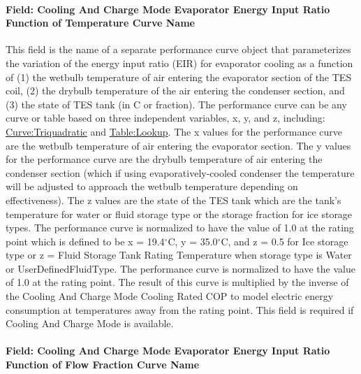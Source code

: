 \paragraph{Field: Cooling And Charge Mode Evaporator Energy Input Ratio Function of Temperature Curve Name}\label{field-cooling-and-charge-mode-evaporator-energy-input-ratio-function-of-temperature-curve-name}

This field is the name of a separate performance curve object that parameterizes the variation of the energy input ratio (EIR) for evaporator cooling as a function of (1) the wetbulb temperature of air entering the evaporator section of the TES coil, (2) the drybulb temperature of the air entering the condenser section, and (3) the state of TES tank (in C or fraction). The performance curve can be any curve or table based on three independent variables, x, y, and z, including: \hyperref[curvetriquadratic]{Curve:Triquadratic} and \hyperref[tablelookup]{Table:Lookup}. The x values for the performance curve are the wetbulb temperature of air entering the evaporator section. The y values for the performance curve are the drybulb temperature of air entering the condenser section (which if using evaporatively-cooled condenser the temperature will be adjusted to approach the wetbulb temperature depending on effectiveness). The z values are the state of the TES tank which are the tank's temperature for water or fluid storage type or the storage fraction for ice storage types. The performance curve is normalized to have the value of 1.0 at the rating point which is defined to be x = 19.4$^\circ$C, y = 35.0$^\circ$C, and z = 0.5 for Ice storage type or z = Fluid Storage Tank Rating Temperature when storage type is Water or UserDefinedFluidType. The performance curve is normalized to have the value of 1.0 at the rating point. The result of this curve is multiplied by the inverse of the Cooling And Charge Mode Cooling Rated COP to model electric energy consumption at temperatures away from the rating point. This field is required if Cooling And Charge Mode is available.

\paragraph{Field: Cooling And Charge Mode Evaporator Energy Input Ratio Function of Flow Fraction Curve Name}\label{field-cooling-and-charge-mode-evaporator-energy-input-ratio-function-of-flow-fraction-curve-name}

